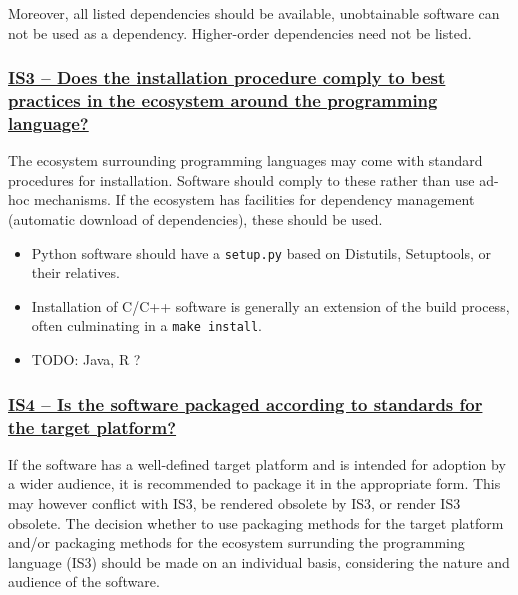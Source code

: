 \documentclass[a4paper,11pt]{article}
\newcommand{\indicator}[1]{\subsubsection*{\underline{#1}}}
\begin{document}
Moreover, all listed dependencies should be available, unobtainable software
can not be used as a dependency. Higher-order dependencies need not be listed.
%
%


\indicator{IS3 -- Does the installation procedure comply to best practices
in the ecosystem around the programming language?}

The ecosystem surrounding programming languages may come with standard
procedures for installation. Software should comply to these rather than use
ad-hoc mechanisms. If the ecosystem has facilities for dependency management
(automatic download of dependencies), these should be used.

\begin{itemize}
 \item Python software should have a \texttt{setup.py} based on Distutils,
     Setuptools, or their relatives.
 \item Installation of C/C++ software is generally an extension of the build
     process, often culminating in a \texttt{make install}.
 \item TODO: Java, R ?
\end{itemize}


\indicator{IS4 -- Is the software packaged according to standards for the target platform?}

If the software has a well-defined target platform and is intended for adoption
by a wider audience, it is recommended to package it in the appropriate form.
This may however conflict with IS3, be rendered obsolete by IS3, or render IS3
obsolete. The decision whether to use packaging methods for the target platform
and/or packaging methods for the ecosystem surrunding the programming language
(IS3) should be
%
%
%
made on an individual basis, considering the nature and audience of the
software.
\end{document}
